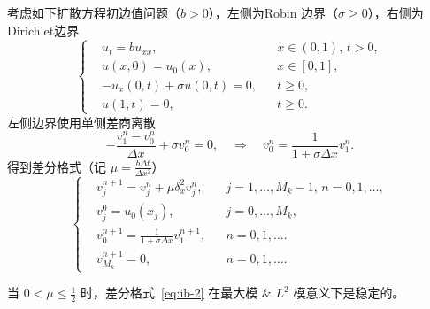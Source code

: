 考虑如下扩散方程初边值问题（$b > 0$），左侧为Robin 边界（$\sigma \ge 0$），右侧为Dirichlet边界
\[
    \left\{
    \begin{aligned}
         & u_t = b u_{xx},                 &  & x \in (0,1),\, t > 0, \\
         & u(x,0) = u_0(x),                &  & x \in [0,1],          \\
         & - u_x(0,t) + \sigma u(0,t) = 0, &  & t \ge 0,              \\
         & u(1,t) = 0,                     &  & t \ge 0.
    \end{aligned}
    \right.
\]
左侧边界使用单侧差商离散
\[
    -  \frac{v_1^n - v_0^n}{\Delta x} + \sigma v_0^n = 0, \quad \Rightarrow \quad v_0^n = \frac{1}{1 + \sigma \Delta x} v_1^n.
\]
得到差分格式（记 $\mu = \frac{b \Delta t}{\Delta x^2}$）
\begin{equation}
    \left\{
    \begin{aligned}
         & v_j^{n+1} = v_j^n + \mu \delta_x^2 v_j^n,            &  & j=1,\dots,M_k-1,\, n=0,1,\dots, \\
         & v_j^0 = u_0(x_j),                                    &  & j=0,\dots,M_k,                  \\
         & v_0^{n+1} = \frac{1}{1 + \sigma \Delta x} v_1^{n+1}, &  & n=0,1,\dots.                    \\
         & v_{M_k}^{n+1} = 0,                                   &  & n=0,1,\dots.
    \end{aligned}
    \right.    \label{eq:ib-2}
\end{equation}

\begin{example}
    当 $0 < \mu \le \frac12$ 时，差分格式~\eqref{eq:ib-2} 在最大模 \& $L^2$ 模意义下是稳定的。
\end{example}

